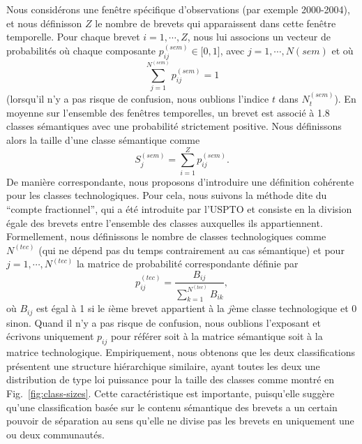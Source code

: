{Nous considérons une fenêtre spécifique d'observations (par exemple 2000-2004), et nous définisson $Z$ le nombre de brevets qui apparaissent dans cette fenêtre temporelle. Pour chaque brevet $i=1, \cdots, Z$, nous lui associons un vecteur de probabilités où chaque composante $p_{ij}^{(sem)} \in \big[ 0,1 \big]$, avec $j = 1, \cdots, N{(sem)}$ et où $$\displaystyle \sum_{j=1}^{N^{(sem)}} p_{ij}^{(sem)} = 1$$ (lorsqu'il n'y a pas risque de confusion, nous oublions l'indice $t$ dans $N_t^{(sem)}$). En moyenne sur l'ensemble des fenêtres temporelles, un brevet est associé à 1.8 classes sémantiques avec une probabilité strictement positive. Nous définissons alors la taille d'une classe sémantique comme $$S_j^{(sem)} = \displaystyle \sum_{i=1}^Z p_{ij}^{(sem)}.$$ De manière correspondante, nous proposons d'introduire une définition cohérente pour les classes technologiques. Pour cela, nous suivons la méthode dite du ``compte fractionnel'', qui a été introduite par l'USPTO et consiste en la division égale des brevets entre l'ensemble des classes auxquelles ils appartiennent. Formellement, nous définissons le nombre de classes technologiques comme $N^{(tec)}$ (qui ne dépend pas du temps contrairement au cas sémantique) et pour $j = 1, \cdots, N^{(tec)}$ la matrice de probabilité correspondante définie par
\[
 p_{ij}^{(tec)} = \frac{B_{ij}}{\displaystyle \sum_{k=1}^{N^{(tec)}}{B_{ik}}},
\]
où $B_{ij}$ est égal à 1 si le $i$ème brevet appartient à la $j$ème classe technologique et 0 sinon. Quand il n'y a pas risque de confusion, nous oublions l'exposant et écrivons uniquement $p_{ij}$ pour référer soit à la matrice sémantique soit à la matrice technologique. Empiriquement, nous obtenons que les deux classifications présentent une structure hiérarchique similaire, ayant toutes les deux une distribution de type loi puissance pour la taille des classes comme montré en Fig.~\ref{fig:class-sizes}. Cette caractéristique est importante, puisqu'elle suggère qu'une classification basée sur le contenu sémantique des brevets a un certain pouvoir de séparation au sens qu'elle ne divise pas les brevets en uniquement une ou deux communautés.
}



